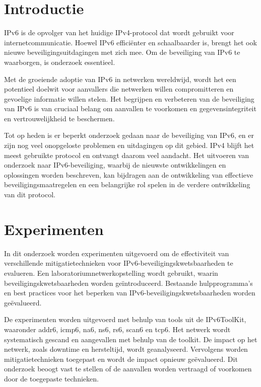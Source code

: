 \documentclass[a0,portrait]{hogent-poster}
\begin{document}
\begin{multicols}{2} %

\section{Introductie}
IPv6 is de opvolger van het huidige IPv4-protocol dat wordt gebruikt voor internetcommunicatie. Hoewel IPv6 efficiënter en schaalbaarder is, brengt het ook nieuwe beveiligingsuitdagingen met zich mee. Om de beveiliging van IPv6 te waarborgen, is onderzoek essentieel.

Met de groeiende adoptie van IPv6 in netwerken wereldwijd, wordt het een potentieel doelwit voor aanvallers die netwerken willen compromitteren en gevoelige informatie willen stelen. Het begrijpen en verbeteren van de beveiliging van IPv6 is van cruciaal belang om aanvallen te voorkomen en gegevensintegriteit en vertrouwelijkheid te beschermen.

Tot op heden is er beperkt onderzoek gedaan naar de beveiliging van IPv6, en er zijn nog veel onopgeloste problemen en uitdagingen op dit gebied. IPv4 blijft het meest gebruikte protocol en ontvangt daarom veel aandacht. Het uitvoeren van onderzoek naar IPv6-beveiliging, waarbij de nieuwste ontwikkelingen en oplossingen worden beschreven, kan bijdragen aan de ontwikkeling van effectieve beveiligingsmaatregelen en een belangrijke rol spelen in de verdere ontwikkeling van dit protocol.

\section{Experimenten}
In dit onderzoek worden experimenten uitgevoerd om de effectiviteit van verschillende mitigatietechnieken voor IPv6-beveiligingskwetsbaarheden te evalueren. Een laboratoriumnetwerkopstelling wordt gebruikt, waarin beveiligingskwetsbaarheden worden geïntroduceerd. Bestaande hulpprogramma's en best practices voor het beperken van IPv6-beveiligingskwetsbaarheden worden geëvalueerd.

De experimenten worden uitgevoerd met behulp van tools uit de IPv6ToolKit, waaronder addr6, icmp6, na6, ns6, rs6, scan6 en tcp6. Het netwerk wordt systematisch gescand en aangevallen met behulp van de toolkit. De impact op het netwerk, zoals downtime en hersteltijd, wordt geanalyseerd. Vervolgens worden mitigatietechnieken toegepast en wordt de impact opnieuw geëvalueerd. Dit onderzoek beoogt vast te stellen of de aanvallen worden vertraagd of voorkomen door de toegepaste technieken.



\end{multicols}
\end{document}
